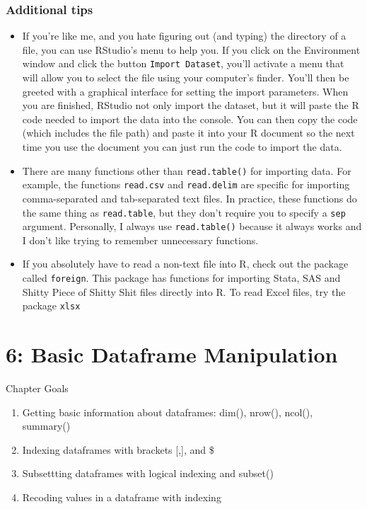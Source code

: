 \documentclass{tufte-book}\usepackage[]{graphicx}\usepackage[]{color}
\begin{document}
\begin{footnotesize}
\subsection{Additional tips}

\begin{itemize}
  \item If you're like me, and you hate figuring out (and typing) the directory of a file, you can use RStudio's menu to help you. If you click on the Environment window and click the button \texttt{Import Dataset}, you'll activate a menu that will allow you to select the file using your computer's finder. You'll then be greeted with a graphical interface for setting the import parameters. When you are finished, RStudio not only import the dataset, but it will paste the R code needed to import the data into the console. You can then copy the code (which includes the file path) and paste it into your R document so the next time you use the document you can just run the code to import the data.
  \item There are many functions other than \texttt{read.table()} for importing data. For example, the functions \texttt{read.csv} and \texttt{read.delim} are specific for importing comma-separated and tab-separated text files. In practice, these functions do the same thing as \texttt{read.table}, but they don't require you to specify a \texttt{sep} argument. Personally, I always use \texttt{read.table()} because it always works and I don't like trying to remember unnecessary functions.
  \item If you absolutely have to read a non-text file into R, check out the package called \texttt{foreign}. This package has functions for importing Stata, SAS and Shitty Piece of Shitty Shit files directly into R. To read Excel files, try the package \texttt{xlsx}

\end{itemize}


\chapter{6: Basic Dataframe Manipulation}
\label{ch:6}


Chapter Goals

\begin{enumerate}
  \item Getting basic information about dataframes: dim(), nrow(), ncol(), summary()
  \item Indexing dataframes with brackets [,], and \$
  \item Subsettting dataframes with logical indexing and subset()
  \item Recoding values in a dataframe with indexing
\end{enumerate}


\end{footnotesize}
\end{document}
